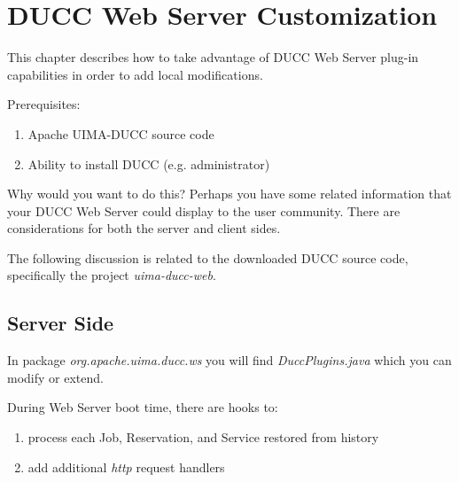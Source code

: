 % 
% 
% 
% 
\ifpdf
\else
{}
\fi
\chapter{DUCC Web Server Customization}

    This chapter describes how to take advantage of DUCC Web Server plug-in
    capabilities in order to add local modifications.

    Prerequisites:
    
    \begin{enumerate}
      \item Apache UIMA-DUCC source code
      \item Ability to install DUCC (e.g. administrator)
    \end{enumerate}
   
	Why would you want to do this?  Perhaps you have some related information
	that your DUCC Web Server could display to the user community.  There are
	considerations for both the server and client sides.
	
	The following discussion is related to the downloaded DUCC source code,
	specifically the project {\em uima-ducc-web}.

\section{Server Side}

	In package {\em org.apache.uima.ducc.ws} you will find 
	{\em DuccPlugins.java} which you can modify or extend.
	
	During Web Server boot time, there are hooks to:
	
	\begin{enumerate}
      \item process each Job, Reservation, and Service restored from history
      \item add additional {\em http} request handlers
    \end{enumerate}
    
